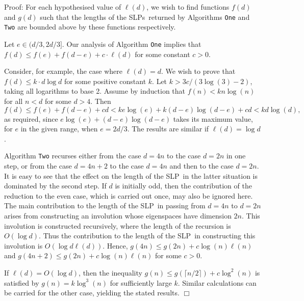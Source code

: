 \documentclass[12pt]{article}
\newenvironment{proof}{\normalsize {\sc Proof}:}{{\hfill $\Box$ \\}}
\def\Oh{O}  %
\def\SLP{{\rm SLP}}
\def\SLPs{{\rm SLPs}}
\begin{document}
\begin{proof}
For each hypothesised value of $\ell(d)$, 
we wish to find functions $f(d)$ and $g(d)$ such that the lengths of
the \SLPs\ returned by Algorithms {\tt One} and {\tt Two} are bounded
above by these functions respectively.

Let $e\in(d/3,2d/3]$. 
Our analysis of Algorithm {\tt One} implies that 
$f(d) \leq f(e) + f(d - e) + c \cdot \ell (d)$ for 
some constant $c > 0$.


Consider, for example, the case where $\ell(d)=d$.
We wish to prove that 
$f (d) \leq k \cdot d \log d$ for some positive constant  $k$.
Let $k>3c/(3\log(3) - 2)$, taking all logarithms to base 2. Assume by induction
that $f(n) < kn\log(n)$ for  all $n<d$ for some $d>4$.  Then 
$$f(d)\le f(e)+f(d-e) +cd  <  
ke\log(e) + k(d-e)\log(d-e) + cd  <  kd\log(d),$$
as required, since $e\log(e)+(d-e)\log(d-e)$ takes its maximum value,
for $e$ in the given range, when $e=2d/3$.
The results are similar if $\ell(d)=\log d$.

Algorithm {\tt Two} recurses either from the case $d=4n$ to the case
$d=2n$ in one step, or from the case $d=4n+2$ to the case $d=4n$ and
then to the case $d=2n$. It is easy to see that the effect on the
length of the \SLP\ in the latter situation is dominated by the second
step. If $d$ is initially odd, then the contribution of the reduction to
the even case, which is carried out once, may also be ignored here.
The main contribution to the length of the \SLP\ in passing from $d=4n$
to $d=2n$ arises from constructing an involution whose eigenspaces
have dimension $2n$. This involution is constructed recursively,
where the length of the recursion is $\Oh(\log d)$. Thus the
contribution to the length of the \SLP\ in constructing this involution
is $\Oh(\log d\ell(d))$. 
Hence, $g(4n)\le g(2n)+c\log(n)\ell(n)$ and $g(4n+2)\le g(2n)+c\log(n)\ell(n)$
for some $c > 0$.

If $\ell(d)=\Oh(\log d)$, then  the inequality 
$g(n)\le g(\lceil n/2\rceil)+c\log^2(n)$
is satisfied by $g(n)=k\log^3(n)$ for sufficiently large $k$. 
Similar calculations can be carried for the other case,
yielding the stated results. 
\end{proof}
\end{document}
